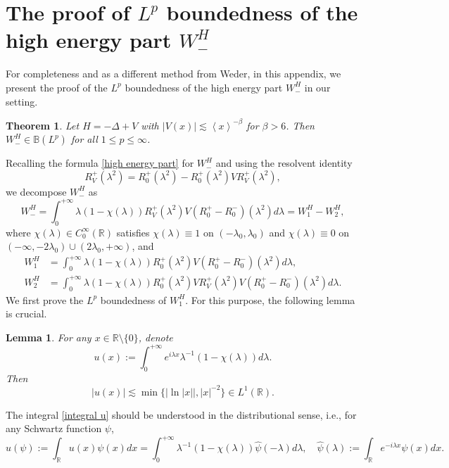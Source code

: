 \documentclass[reqno]{amsart}
\newtheorem{theorem}[definition]{Theorem}
\newtheorem{lemma}[definition]{Lemma}
\newcommand\R{\mathbb{R}}
\newcommand\B{\mathbb{B}}
\numberwithin{equation}{section}
\begin{document}
\section{The proof of $L^p$ boundedness of the high energy part $W^H_{-}$}\label{subsec of high energy part}
For completeness and as a different method from Weder\cite{Wed99}, in this appendix, we present the proof of the $L^p$ boundedness of the high energy part $W^H_{-}$ in our setting.
\begin{theorem}\label{bounds of high energy}
 Let $H=-\Delta+V$ with $|V(x)|\lesssim \left<x\right>^{-\beta}$ for $\beta>6$. Then $W^{H}_{-}\in\B(L^p)$ for all $1\leq p\leq\infty$.
\end{theorem}
Recalling the formula \eqref{high energy part} for $W^H_{-}$ and using the resolvent identity
\begin{equation*} R^+_V(\lambda^2)=R^+_0(\lambda^2)-R^+_0(\lambda^2)VR^+_V(\lambda^2),
\end{equation*}  
we decompose $W^{H}_{-}$ as
$$W^{H}_{-}=\int_{0}^{+\infty}\lambda(1-\chi(\lambda))R^{+}_{V}(\lambda^{2})V(R^+_{0}-R^-_{0})({\lambda}^{2})d\lambda=W^H_{1}-W^H_2,$$
where $\chi(\lambda)\in C^{\infty}_{0}(\R)$ satisfies $\chi(\lambda)\equiv1 $ on $(-\lambda_{0},\lambda_{0})$ and  $\chi(\lambda)\equiv0 $ on $(-\infty,-2\lambda_{0})\cup(2\lambda_{0},+\infty)$, and
\begin{align*}
W^H_{1}&=\int_{0}^{+\infty}\lambda(1-\chi(\lambda))R^{+}_{0}(\lambda^{2})V(R^+_{0}-R^-_{0})({\lambda}^{2})d\lambda,\\
W^H_{2}&=\int_{0}^{+\infty}\lambda(1-\chi(\lambda))R^{+}_{0}(\lambda^{2})VR^+_V(\lambda^2)V(R^+_{0}-R^-_{0})({\lambda}^{2})d\lambda.
\end{align*}
We first prove the $L^p$ boundedness of $W^H_{1}$. For this purpose, the following lemma is crucial.
\begin{lemma}\label{lemma of estim of u(x)}
For any $x\in\R\setminus\{0\}$, denote 
\begin{equation}\label{integral u}
u(x):=\int_{0}^{+\infty}e^{i\lambda x}\lambda^{-1}(1-\chi(\lambda)) d\lambda.
\end{equation}
Then 
\begin{equation}\label{estim of u(x)}
|u(x)|\lesssim\min\{|\ln|x||,|x|^{-2}\}\in L^1(\R).
\end{equation}
\end{lemma} 
The integral \eqref{integral u} should be understood in the distributional sense, i.e., for any Schwartz function $\psi$, 
\begin{equation*}
u(\psi):=\int_{\R}u(x)\psi(x)dx=\int_{0}^{+\infty}\lambda^{-1}(1-\chi(\lambda))\hat{\psi}(-\lambda)d\lambda, \quad \hat{\psi}(\lambda):=\int_{\R}e^{-i\lambda x}\psi(x)dx.
\end{equation*}
\end{document}
